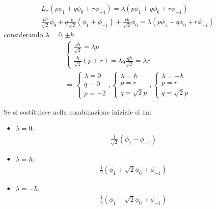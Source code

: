\begin{equation}\begin{split}
L_x\left(p\phi_1+q\phi_0+r\phi_{-1}\right)=\lambda \left(p\phi_1+q\phi_0+r\phi_{-1}\right)\\
\frac{p\hbar }{\sqrt{2}}\phi_0+q\frac{\hbar }{\sqrt{2}}\left(\phi_1+\phi_{-1}\right)+\frac{r\hbar }{\sqrt{2}}\phi_0=\lambda\left(p\phi_1+q\phi_0+r\phi_{-1}\right)
\end{split}\end{equation}
considerando $\lambda=0,\pm\hbar $
\begin{equation}\begin{split}
\begin{cases}
\frac{q\hbar }{\sqrt{2}}=\lambda p\\
\frac{\hbar }{\sqrt{2}}\left(p+r\right)=\lambda q
\frac{q\hbar }{\sqrt{2}}=\lambda r
\end{cases}\\
\Longrightarrow
\begin{cases}
\lambda=0\\
q=0\\
p=-2
\end{cases},
\begin{cases}
\lambda=\hbar \\
p=r\\
q=\sqrt{2} p
\end{cases},
\begin{cases}
\lambda=-\hbar \\
p=r\\
q=\sqrt{2}p
\end{cases}
\end{split}\end{equation}

Se si sostituisce nella combinazione iniziale si ha:
\begin{itemize}
\item $\lambda=0$:
\begin{equation}\begin{split}
\frac{1}{\sqrt{2}}\left(\phi_1-\phi_{-1}\right)
\end{split}\end{equation}
\item $\lambda=\hbar $:
\begin{equation}\begin{split}
\frac{1}{2}\left(\phi_1+\sqrt{2}\phi_0+\phi_{-1}\right)
\end{split}\end{equation}
\item $\lambda=-\hbar $:
\begin{equation}\begin{split}
\frac{1}{2}\left(\phi_1-\sqrt{2}\phi_0+\phi_{-1}\right)
\end{split}\end{equation}
\end{itemize}

